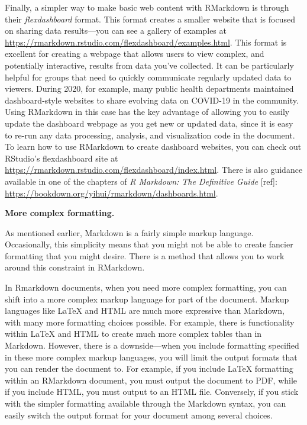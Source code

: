 \documentclass[]{tufte-book}
\begin{document}
Finally, a simpler way to make basic web content with RMarkdown is through their
\emph{flexdashboard} format. This format creates a smaller website that is focused on
sharing data results---you can see a gallery of examples at
\url{https://rmarkdown.rstudio.com/flexdashboard/examples.html}. This format is
excellent for creating a webpage that allows users to view complex, and
potentially interactive, results from data you've collected. It can be
particularly helpful for groups that need to quickly communicate regularly
updated data to viewers. During 2020, for example, many public health
departments maintained dashboard-style websites to share evolving data on
COVID-19 in the community. Using RMarkdown in this case has the key advantage of
allowing you to easily update the dashboard webpage as you get new or updated
data, since it is easy to re-run any data processing, analysis, and
visualization code in the document. To learn how to use RMarkdown to create
dashboard websites, you can check out RStudio's flexdashboard site at
\url{https://rmarkdown.rstudio.com/flexdashboard/index.html}. There is also guidance
available in one of the chapters of \emph{R Markdown: The Definitive Guide} {[}ref{]}:
\url{https://bookdown.org/yihui/rmarkdown/dashboards.html}.

\textbf{More complex formatting.}

As mentioned earlier, Markdown is a fairly simple markup language. Occasionally,
this simplicity means that you might not be able to create fancier formatting
that you might desire. There is a method that allows you to work around this
constraint in RMarkdown.

In Rmarkdown documents, when you need more complex formatting, you can shift
into a more complex markup language for part of the document. Markup languages
like LaTeX and HTML are much more expressive than Markdown, with many more
formatting choices possible. For example, there is functionality within
LaTeX and HTML to create much more complex tables than in Markdown. However,
there is a downside---when you include formatting specified in these
more complex markup languages, you will limit the output formats that you can
render the document to. For example, if you include LaTeX formatting within
an RMarkdown document, you must output the document to PDF, while if you
include HTML, you must output to an HTML file. Conversely, if you stick with
the simpler formatting available through the Markdown syntax, you can easily
switch the output format for your document among several choices.
\end{document}
